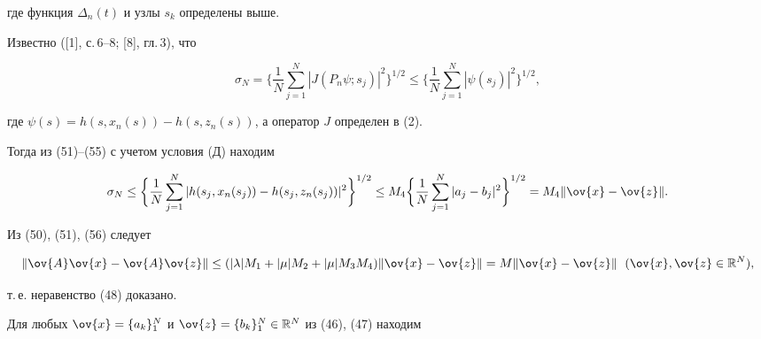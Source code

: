 где функция $\Delta_n(t)$ и узлы $s_k$ определены выше.





Известно ([1], с.\,6--8; [8], гл.\,3), что


\begin{equation}


\sigma_N=\biggl\{\frac{1}{N}\sum_{j=1}^N|J(P_n\psi;s_j)|^2\biggr\}


^{1/2}\leq \biggl\{\frac{1}{N}\sum_{j=1}^N|\psi(s_j)|^2\biggr\}


^{1/2},


\end{equation}


где $\psi(s)=h(s,x_n(s))-h(s,z_n(s))$, а оператор $J$ определен в (2).


Тогда из (51)--(55) с учетом условия (Д) находим


\begin{equation}


\sigma_N\leq \biggl\{\frac{1}{N}\sum_{j=1}^N|h(s_j,x_n(s_j))-


h(s_j,z_n(s_j))|^2\biggr\}^{1/2}\leq


M_4\biggl\{\frac{1}{N}\sum_{j=1}^N|a_j-b_j|^2\biggr\}^{1/2}=


M_4 \|\ov{x}-\ov{z}\|.


\end{equation}


Из (50), (51), (56) следует


$$


\|\ov{A}\ov{x}-\ov{A}\ov{z}\|\leq (|\lambda| M_1+


|\mu| M_2+|\mu| M_3M_4) \|\ov{x}-\ov{z}\|=


M \|\ov{x}-\ov{z}\|\ \; (\ov{x},\ov{z}\in \Bbb R^N),


$$


т.\,е. неравенство (48) доказано.





Для любых $\ov{x}=\{a_k\}_1^N$ и $\ov{z}=


\{b_k\}_1^N\in \Bbb R^N$ из (46), (47) находим


